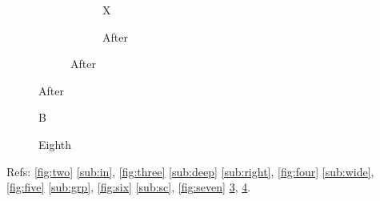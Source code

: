 \documentclass{article}
\begin{document}
\begin{figure}
  \caption{Seventh}\label{fig:seven}
  \begin{subfigure}{0.45\textwidth}
    \begin{subfigure}{0.5\textwidth}X\caption{After}\label{sub:after}\end{subfigure}
  \end{subfigure}
\end{figure}
\begin{figure}B\caption{Eighth}\label{fig:eight}\end{figure}
Refs: \ref{fig:two} \ref{sub:in}, \ref{fig:three} \ref{sub:deep} \ref{sub:right}, \ref{fig:four} \ref{sub:wide},
\ref{fig:five} \ref{sub:grp}, \ref{fig:six} \ref{sub:sc}, \ref{fig:seven} \ref{sub:after}, \ref{fig:eight}.
\end{document}
